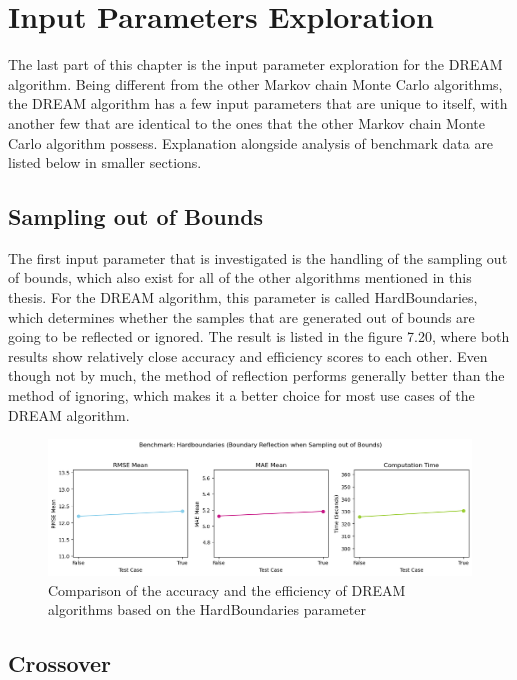 \section{Input Parameters Exploration}
The last part of this chapter is the input parameter exploration for the DREAM algorithm. Being different from the other Markov chain Monte Carlo algorithms, the DREAM algorithm has a few input parameters that are unique to itself, with another few that are identical to the ones that the other Markov chain Monte Carlo algorithm possess. Explanation alongside analysis of benchmark data are listed below in smaller sections. 

\subsection{Sampling out of Bounds}
The first input parameter that is investigated is the handling of the sampling out of bounds, which also exist for all of the other algorithms mentioned in this thesis. For the DREAM algorithm, this parameter is called HardBoundaries, which determines whether the samples that are generated out of bounds are going to be reflected or ignored. The result is listed in the figure 7.20, where both results show relatively close accuracy and efficiency scores to each other. Even though not by much, the method of reflection performs generally better than the method of ignoring, which makes it a better choice for most use cases of the DREAM algorithm.

\begin{figure}[H]
    \centering
    \includegraphics[width=1\textwidth]{figures/dream/sotb.png}
    \captionsetup{width=.8\textwidth}
    \caption{Comparison of the accuracy and the efficiency of DREAM algorithms based on the HardBoundaries parameter}
    \label{fig:enter-label}
\end{figure}

\subsection{Crossover}

